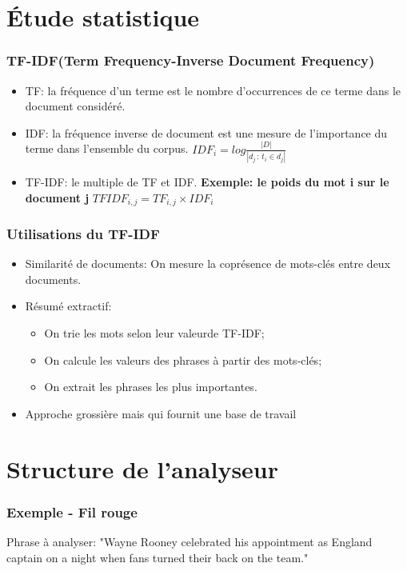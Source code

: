 \documentclass{beamer}
\begin{document}
\section{Étude statistique}
    \begin{frame}
    \frametitle{TF-IDF(Term Frequency-Inverse Document Frequency)}
        \begin{itemize}
            \item TF: la fréquence d'un terme est le nombre d'occurrences de ce terme dans le document considéré.
            \item IDF: la fréquence inverse de document est une mesure de l'importance du terme dans l'ensemble du corpus.
                $IDF_{i}=log \frac{|D|}{|d_{j}\,:\,t_{i}\in d_{j}|}$
            \item TF-IDF: le multiple de TF et IDF.\newline{}
                \textbf{Exemple: le poids du mot i sur le document j}
                $TFIDF_{i,j} = TF_{i,j} \times IDF_{i}$
        \end{itemize}
    \end{frame}

    \begin{frame}
    \frametitle{Utilisations du TF-IDF}
        \begin{itemize}
        \item Similarité de documents:\newline{}
        On mesure la coprésence de mots-clés entre deux documents.
        \item Résumé extractif:
            \begin{itemize}
                \item On trie les mots selon leur valeurde TF-IDF;
                \item On calcule les valeurs des phrases à partir des mots-clés;
                \item On extrait les phrases les plus importantes.
            \end{itemize}
        \item Approche grossière mais qui fournit une base de travail
        \end{itemize}
    \end{frame}


\section{Structure de l'analyseur}%
    \begin{frame}
        \frametitle{Exemple - Fil rouge}
        Phrase à analyser:\newline{}
        "Wayne Rooney celebrated his appointment as England captain on a night when
        fans turned their back on the team."
    \end{frame}
\end{document}
